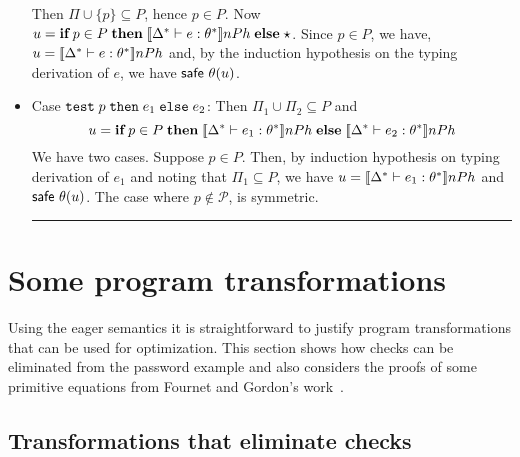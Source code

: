 \documentclass[submission,copyright,creativecommons]{eptcs}
\newcommand{\blackslug}{\rule{7pt}{7pt}}
\newcommand{\mifthenelse}[3]{\MIF\;#1\;\MTHEN\;#2\;\MELSE\;#3}
\newcommand{\test}[3]{\TEST\;#1\;\THEN\;#2\;\ELSE\;#3}
\newcommand{\ELSE}{\mbox{\texttt{else}}}
\newcommand{\THEN}{{\texttt{then}}}
\newcommand{\MTHEN}{{\textbf{then}}}
\newcommand{\MELSE}{{\textbf{else}}}
\newcommand{\MIF}{{\textbf{if}}}
\renewcommand{\P}{\mathcal{P}}
\newcommand{\ldb}{[\![}
\newcommand{\rdb}{]\!]}
\newcommand{\means}[1]{\ldb {#1}\rdb}
\newcommand{\union}{\cup}
\newcommand{\proves}{\vdash}
\newcommand{\TEST}{\mbox{\texttt{test}}}
\newcommand{\safe}{\textsf{safe}}
\newcommand{\n}{n} \newcommand{\p}{p} \newcommand{\Ps}{\Pi} \newcommand{\h}{h}
\newenvironment{xproof}{\begin{trivlist}\item[\hskip\labelsep{\bf  
Proof:}]}{\end{trivlist}}
\begin{document}
\begin{xproof}
\begin{itemize}
\begin{sloppypar}
Then $\Ps\union\{\p\}\subseteq P$, hence $\p\in P$.
Now \( u=\mifthenelse{\p\in P}{\means{\Delta^*\proves e:\th^*}\n P \h}{\star} \).
Since $\p\in P$, we have,
$u=\means{\Delta^*\proves e:\th^*}\n P \h$ and, by the induction
hypothesis on the typing derivation of $e$, we have $\safe~ {\th}(u)$.
\end{sloppypar}
\item Case $\test{\p}{e_1}{e_2}$:
Then $\Ps_1\union\Ps_2\subseteq P$ and 
\[ u=\mifthenelse{\p\in P}{\means{\Delta^*\proves e_1:\th^*}\n P \h}
               {\means{\Delta^*\proves e_2:\th^*}\n P \h} \]
We have two cases. Suppose $\p\in P$. Then,
by induction hypothesis on typing derivation of $e_1$ and noting that
$\Ps_1\subseteq P$, we have $u=\means{\Delta^*\proves e_1:\th^*}\n P \h$ and $\safe~
{\th}(u)$. The case where $\p\not\in\P$, is symmetric. 
\blackslug
\end{itemize}
\end{xproof}





\section{Some program transformations}
\label{sec:tran}
Using the eager semantics it is straightforward to justify program transformations
that can be used for optimization.  
This section shows how checks can be eliminated from the password example 
and also considers the proofs of some primitive equations from Fournet and Gordon's work~\cite{FournetG03}.

\subsection{Transformations that eliminate checks}\label{sec:elimcheck}
\end{document}
